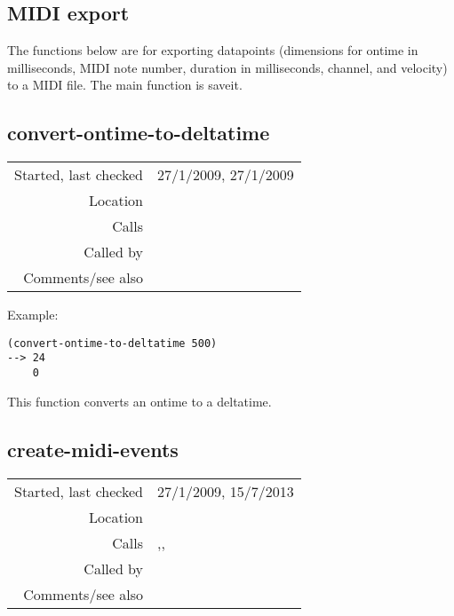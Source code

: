 \subsection{MIDI export}\label{sec:MIDI-export}

The functions below are for exporting datapoints
(dimensions for ontime in milliseconds, MIDI note
number, duration in milliseconds, channel, and
velocity) to a MIDI file. The main function is
saveit.


\subsection*{convert-ontime-to-deltatime}\label{fun:convert-ontime-to-deltatime}

\vspace{0.3cm}
\begin{tabular}{r|p{8cm}}
Started, last checked & 27/1/2009, 27/1/2009 \\
Location & \nameref{sec:MIDI-export} \\
Calls & \\
Called by & \nameref{fun:create-midi-events} \\
Comments/see also &
\end{tabular}

\vspace{0.5cm}
\noindent Example:
\begin{verbatim}
(convert-ontime-to-deltatime 500)
--> 24
    0
\end{verbatim}

\noindent This function converts an ontime to a
deltatime.


\subsection*{create-midi-events}\label{fun:create-midi-events}

\vspace{0.3cm}
\begin{tabular}{r|p{8cm}}
Started, last checked & 27/1/2009, 15/7/2013 \\
Location & \nameref{sec:MIDI-export} \\
Calls & \nameref{fun:convert-ontime-to-deltatime},\newline \nameref{fun:make-midi-note-msg}, \nameref{fun:make-midi-pc-msg} \\
Called by & \nameref{fun:create-MTrk} \\
Comments/see also &
\end{tabular}

